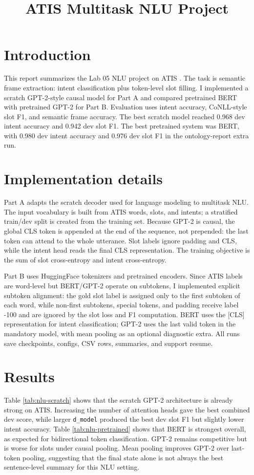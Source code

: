 \documentclass[a4paper]{article}
\title{ATIS Multitask NLU Project}
\begin{document}
\maketitle

\section{Introduction}
This report summarizes the Lab 05 NLU project on ATIS \cite{hemphill1990atis}. The task is semantic frame extraction: intent classification plus token-level slot filling. I implemented a scratch GPT-2-style causal model for Part A and compared pretrained BERT \cite{devlin2019bert} with pretrained GPT-2 \cite{radford2019language} for Part B. Evaluation uses intent accuracy, CoNLL-style slot F1, and semantic frame accuracy. The best scratch model reached 0.968 dev intent accuracy and 0.942 dev slot F1. The best pretrained system was BERT, with 0.980 dev intent accuracy and 0.976 dev slot F1 in the ontology-report extra run.

\section{Implementation details}
Part A adapts the scratch decoder used for language modeling to multitask NLU. The input vocabulary is built from ATIS words, slots, and intents; a stratified train/dev split is created from the training set. Because GPT-2 is causal, the global CLS token is appended at the end of the sequence, not prepended: the last token can attend to the whole utterance. Slot labels ignore padding and CLS, while the intent head reads the final CLS representation. The training objective is the sum of slot cross-entropy and intent cross-entropy.

Part B uses HuggingFace tokenizers and pretrained encoders. Since ATIS labels are word-level but BERT/GPT-2 operate on subtokens, I implemented explicit subtoken alignment: the gold slot label is assigned only to the first subtoken of each word, while non-first subtokens, special tokens, and padding receive label -100 and are ignored by the slot loss and F1 computation. BERT uses the [CLS] representation for intent classification; GPT-2 uses the last valid token in the mandatory model, with mean pooling as an optional diagnostic extra. All runs save checkpoints, configs, CSV rows, summaries, and support resume.

\section{Results}
Table \ref{tab:nlu-scratch} shows that the scratch GPT-2 architecture is already strong on ATIS. Increasing the number of attention heads gave the best combined dev score, while larger \texttt{d\_model} produced the best dev slot F1 but slightly lower intent accuracy. Table \ref{tab:nlu-pretrained} shows that BERT is strongest overall, as expected for bidirectional token classification. GPT-2 remains competitive but is worse for slots under causal pooling. Mean pooling improves GPT-2 over last-token pooling, suggesting that the final state alone is not always the best sentence-level summary for this NLU setting.
\end{document}
